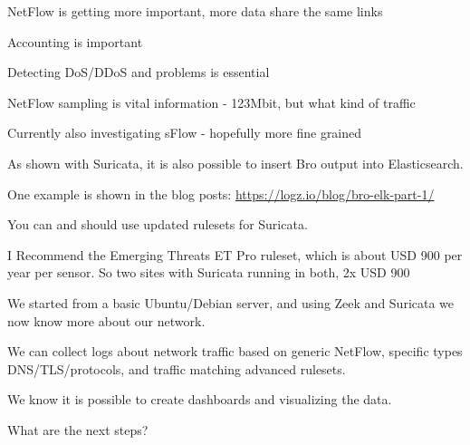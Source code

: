 \documentclass[Screen16to9,17pt]{foils}
\begin{document}

\begin{slidelist}
\item NetFlow is getting more important, more data share the same links
\item Accounting is important
\item Detecting DoS/DDoS and problems is essential
\item NetFlow sampling is vital information - 123Mbit, but what kind of traffic
\item Currently also investigating sFlow - hopefully more fine grained
\end{slidelist}





As shown with Suricata, it is also possible to insert Bro output into Elasticsearch.

One example is shown in the blog posts:
\url{https://logz.io/blog/bro-elk-part-1/}



You can and should use updated rulesets for Suricata.

I Recommend the Emerging Threats ET Pro ruleset, which is about USD 900 per year per sensor. So two sites with Suricata running in both, 2x USD 900


We started from a basic Ubuntu/Debian server, and using Zeek and Suricata we now know more about our network.

We can collect logs about network traffic based on generic NetFlow, specific types DNS/TLS/protocols, and traffic matching advanced rulesets.

We know it is possible to create dashboards and visualizing the data.

What are the next steps?


\myquestionspage
\end{document}
